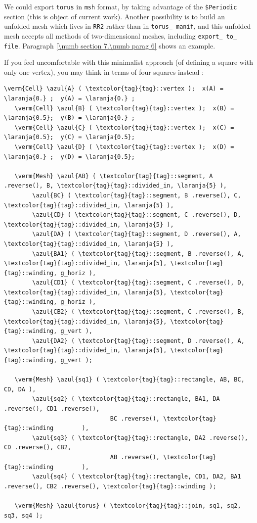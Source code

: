 We could export {\small\tt torus} in {\small\tt msh} format, by taking advantage of the
{\small\tt \$Periodic} section (this is object of current work).
Another possibility is to build an unfolded mesh which lives in {\small\tt RR2} rather than in
{\small\tt torus\_\,manif}, and this unfolded mesh accepts all methods of two-dimensional
meshes, including {\small\tt export\_\,to\_\,file}.
Paragraph \ref{\numb section 7.\numb parag 6} shows an example.

If you feel uncomfortable with this minimalist approach (of defining a square with only one vertex), 
you may think in terms of four squares instead :

\begin{Verbatim}[commandchars=\\\{\},formatcom=\small\tt,
   baselinestretch=0.94,framesep=2mm                      ]
   \verm{Cell} \azul{A} ( \textcolor{tag}{tag}::vertex );  x(A) = \laranja{0.} ;  y(A) = \laranja{0.} ;
   \verm{Cell} \azul{B} ( \textcolor{tag}{tag}::vertex );  x(B) = \laranja{0.5};  y(B) = \laranja{0.} ;
   \verm{Cell} \azul{C} ( \textcolor{tag}{tag}::vertex );  x(C) = \laranja{0.5};  y(C) = \laranja{0.5};
   \verm{Cell} \azul{D} ( \textcolor{tag}{tag}::vertex );  x(D) = \laranja{0.} ;  y(D) = \laranja{0.5};

   \verm{Mesh} \azul{AB} ( \textcolor{tag}{tag}::segment, A .reverse(), B, \textcolor{tag}{tag}::divided_in, \laranja{5} ),
        \azul{BC} ( \textcolor{tag}{tag}::segment, B .reverse(), C, \textcolor{tag}{tag}::divided_in, \laranja{5} ),
        \azul{CD} ( \textcolor{tag}{tag}::segment, C .reverse(), D, \textcolor{tag}{tag}::divided_in, \laranja{5} ),
        \azul{DA} ( \textcolor{tag}{tag}::segment, D .reverse(), A, \textcolor{tag}{tag}::divided_in, \laranja{5} ),
        \azul{BA1} ( \textcolor{tag}{tag}::segment, B .reverse(), A, \textcolor{tag}{tag}::divided_in, \laranja{5}, \textcolor{tag}{tag}::winding, g_horiz ),
        \azul{CD1} ( \textcolor{tag}{tag}::segment, C .reverse(), D, \textcolor{tag}{tag}::divided_in, \laranja{5}, \textcolor{tag}{tag}::winding, g_horiz ),
        \azul{CB2} ( \textcolor{tag}{tag}::segment, C .reverse(), B, \textcolor{tag}{tag}::divided_in, \laranja{5}, \textcolor{tag}{tag}::winding, g_vert ),
        \azul{DA2} ( \textcolor{tag}{tag}::segment, D .reverse(), A, \textcolor{tag}{tag}::divided_in, \laranja{5}, \textcolor{tag}{tag}::winding, g_vert );

   \verm{Mesh} \azul{sq1} ( \textcolor{tag}{tag}::rectangle, AB, BC, CD, DA ),
        \azul{sq2} ( \textcolor{tag}{tag}::rectangle, BA1, DA .reverse(), CD1 .reverse(),
                              BC .reverse(), \textcolor{tag}{tag}::winding        ),
        \azul{sq3} ( \textcolor{tag}{tag}::rectangle, DA2 .reverse(), CD .reverse(), CB2,
                              AB .reverse(), \textcolor{tag}{tag}::winding        ),
        \azul{sq4} ( \textcolor{tag}{tag}::rectangle, CD1, DA2, BA1 .reverse(), CB2 .reverse(), \textcolor{tag}{tag}::winding );
	
   \verm{Mesh} \azul{torus} ( \textcolor{tag}{tag}::join, sq1, sq2, sq3, sq4 );
\end{Verbatim}

